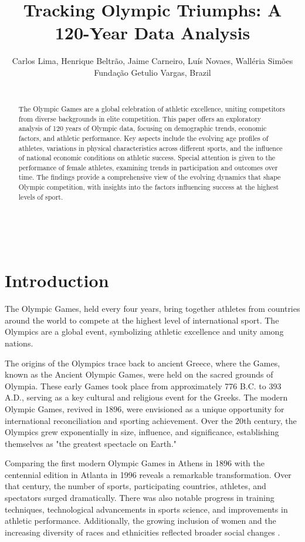 \documentclass{article}
\title{Tracking Olympic Triumphs: A 120-Year Data Analysis}
\author{Carlos Lima, Henrique Beltrão, Jaime Carneiro,  Luís Novaes, Walléria Simões \\
        \small Fundação Getulio Vargas, Brazil \\\\
}
\date{}
\begin{document}
\maketitle
\begin{abstract} 
\noindent The Olympic Games are a global celebration of athletic excellence, uniting competitors from diverse backgrounds in elite competition. This paper offers an exploratory analysis of 120 years of Olympic data, focusing on demographic trends, economic factors, and athletic performance. Key aspects include the evolving age profiles of athletes, variations in physical characteristics across different sports, and the influence of national economic conditions on athletic success. Special attention is given to the performance of female athletes, examining trends in participation and outcomes over time. The findings provide a comprehensive view of the evolving dynamics that shape Olympic competition, with insights into the factors influencing success at the highest levels of sport.\end{abstract}

\noindent{}\\

\section{Introduction}

The Olympic Games, held every four years, bring together athletes from countries around the world to compete at the highest level of international sport. The Olympics are a global event, symbolizing athletic excellence and unity among nations.

The origins of the Olympics trace back to ancient Greece, where the Games, known as the Ancient Olympic Games, were held on the sacred grounds of Olympia. These early Games took place from approximately 776 B.C. to 393 A.D., serving as a key cultural and religious event for the Greeks. The modern Olympic Games, revived in 1896, were envisioned as a unique opportunity for international reconciliation and sporting achievement. Over the 20th century, the Olympics grew exponentially in size, influence, and significance, establishing themselves as "the greatest spectacle on Earth."

Comparing the first modern Olympic Games in Athens in 1896 with the centennial edition in Atlanta in 1996 reveals a remarkable transformation. Over that century, the number of sports, participating countries, athletes, and spectators surged dramatically. There was also notable progress in training techniques, technological advancements in sports science, and improvements in athletic performance. Additionally, the growing inclusion of women and the increasing diversity of races and ethnicities reflected broader social changes \cite{Lancelotti}.
\end{document}
